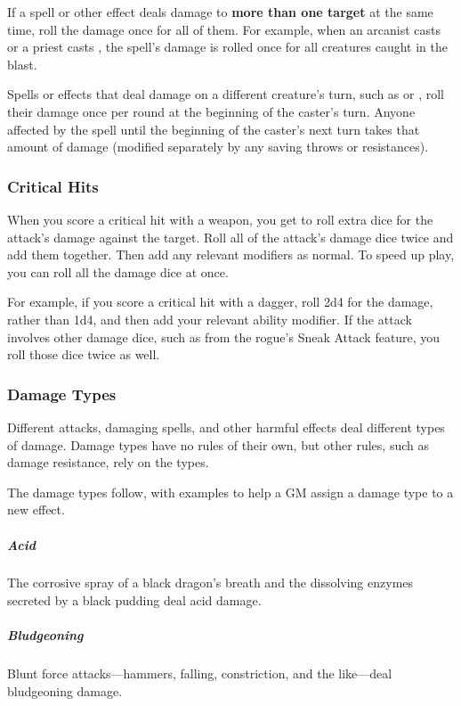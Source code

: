 If a spell or other effect deals damage to \textbf{more than one target} at the same time, roll the damage once for all of them. For example, when an arcanist casts  or a priest casts , the spell's damage is rolled once for all creatures caught in the blast.

Spells or effects that deal damage on a different creature's turn, such as  or , roll their damage once per round at the beginning of the caster's turn. Anyone affected by the spell until the beginning of the caster's next turn takes that amount of damage (modified separately by any saving throws or resistances).

\subsubsection{Critical Hits} \label{sec:critical-hits}

When you score a critical hit with a weapon, you get to roll extra dice for the attack's damage against the target. Roll all of the attack's damage dice twice and add them together. Then add any relevant modifiers as normal. To speed up play, you can roll all the damage dice at once.

For example, if you score a critical hit with a dagger, roll 2d4 for the damage, rather than 1d4, and then add your relevant ability modifier. If the attack involves other damage dice, such as from the rogue's Sneak Attack feature, you roll those dice twice as well.

\subsubsection{Damage Types}

Different attacks, damaging spells, and other harmful effects deal different types of damage. Damage types have no rules of their own, but other rules, such as damage resistance, rely on the types.

The damage types follow, with examples to help a GM assign a damage type to a new effect.

\subparagraph*{Acid} The corrosive spray of a black dragon's breath and the dissolving enzymes secreted by a black pudding deal acid damage.

\subparagraph*{Bludgeoning} Blunt force attacks—hammers, falling, constriction, and the like—deal bludgeoning damage.

